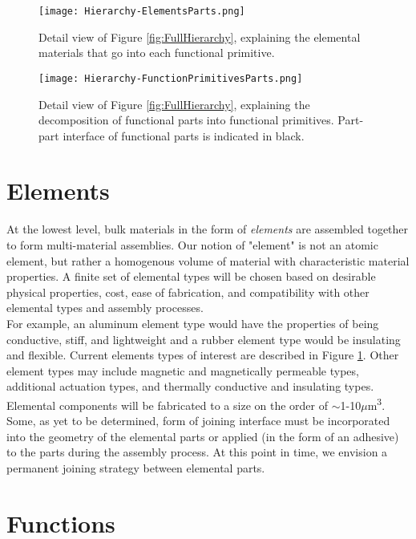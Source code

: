 {\begin{figure}
  \texttt{[image: Hierarchy-ElementsParts.png]}
  \caption{Detail view of Figure \ref{fig:FullHierarchy}, explaining the elemental materials that go into each functional primitive.}
  \label{fig:Hierarchy-ElementsParts}
\end{figure}

\begin{figure}
  \texttt{[image: Hierarchy-FunctionPrimitivesParts.png]}
  \caption{Detail view of Figure \ref{fig:FullHierarchy}, explaining the decomposition of functional parts into functional primitives.  Part-part interface of functional parts is indicated in black.}
  \label{fig:Hierarchy-FunctionPrimitivesParts}
\end{figure}

\section{Elements}\label{sec:elements}

At the lowest level, bulk materials in the form of \textit{elements} are assembled together to form multi-material assemblies.  Our notion of "element" is not an atomic element, but rather a homogenous volume of material with characteristic material properties.  A finite set of elemental types will be chosen based on desirable physical properties, cost, ease of fabrication, and compatibility with other elemental types and assembly processes.\\

For example, an aluminum element type would have the properties of being conductive, stiff, and lightweight and a rubber element type would be insulating and flexible.  Current elements types of interest are described in Figure \ref{fig:Hierarchy-ElementsParts}.  Other element types may include magnetic and magnetically permeable types, additional actuation types, and thermally conductive and insulating types.\\

Elemental components will be fabricated to a size on the order of $\sim$1-10$\mu$m\textsuperscript{3}.  Some, as yet to be determined, form of joining interface must be incorporated into the geometry of the elemental parts or applied (in the form of an adhesive) to the parts during the assembly process.  At this point in time, we envision a permanent joining strategy between elemental parts.

\section{Functions}

}
